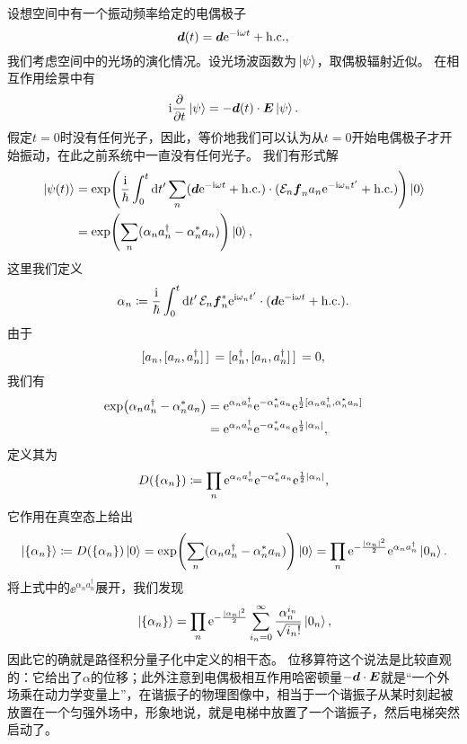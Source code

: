 设想空间中有一个振动频率给定的电偶极子
\begin{equation}
    \vb*{d}(t) = \vb*{d} \mathrm{e}^{- \mathrm{i} \omega t } + \text{h.c.},
\end{equation}
我们考虑空间中的光场的演化情况。设光场波函数为$\ket*{\psi}$，取偶极辐射近似。
在相互作用绘景中有
\begin{equation}
    \mathrm{i} \pdv{t} \ket*{\psi} = - \vb*{d}(t) \cdot \vb*{E} \ket*{\psi}.
\end{equation}
假定$t=0$时没有任何光子，因此，等价地我们可以认为从$t=0$开始电偶极子才开始振动，在此之前系统中一直没有任何光子。
我们有形式解
\[
    \begin{aligned}
        \ket*{\psi(t)} &= \exp(\frac{\mathrm{i}}{\hbar} \int_0^t \dd{t'} \sum_n (\vb*{d} \mathrm{e}^{- \mathrm{i} \omega t } + \text{h.c.}) \cdot (\mathcal{E}_n \vb*{f}_n a_n \mathrm{e}^{- \mathrm{i} \omega_n t'} + \text{h.c.}) ) \ket*{0} \\
        &= \exp(\sum_n (\alpha_n a_n^\dagger - \alpha_n^* a_n) ) \ket*{0},
    \end{aligned}
\]
这里我们定义
\begin{equation}
    \alpha_n \coloneqq \frac{\mathrm{i}}{\hbar} \int_0^t \dd{t'} \mathcal{E}_n \vb*{f}_n^* \mathrm{e}^{\mathrm{i} \omega_n t'} \cdot (\vb*{d} \mathrm{e}^{- \mathrm{i} \omega t} + \text{h.c.}).
\end{equation}
由于
\[
    \comm*{a_n}{\comm*{a_n}{a^\dagger_n}} = \comm*{a^\dagger_n}{\comm*{a_n}{a^\dagger_n}} = 0,
\]
我们有
\[
    \begin{aligned}
        \exp(\alpha_n a_n^\dagger - \alpha_n^* a_n) &= \ee^{\alpha_n a_n^\dagger} \ee^{- \alpha_n^* a_n} \ee^{\frac{1}{2} \comm*{\alpha_n a_n^\dagger}{\alpha_n^* a_n}} \\
        &= \ee^{\alpha_n a_n^\dagger} \ee^{- \alpha_n^* a_n} \ee^{\frac{1}{2} \abs{\alpha_n}},
    \end{aligned}
\]
定义其为
\begin{equation}
    D(\{\alpha_n\}) \coloneqq \prod_n \mathrm{e}^{\alpha_n a_n^\dagger} \mathrm{e}^{- \alpha_n^* a_n} \mathrm{e}^{\frac{1}{2} \abs{\alpha_n}},
    \label{eq:displacement-operator}
\end{equation}
它作用在真空态上给出
\begin{equation}
    \ket*{\{\alpha_n\}} \coloneqq D(\{\alpha_n\}) \ket*{0} = \exp(\sum_n (\alpha_n a_n^\dagger - \alpha_n^* a_n) ) \ket*{0} = \prod_n \mathrm{e}^{- \frac{\abs{\alpha_n}^2}{2}} \mathrm{e}^{\alpha_n a^\dagger_n} \ket*{0_n}.
\end{equation}
将上式中的$\ee^{\alpha_n a^\dagger_n}$展开，我们发现
\begin{equation}
    \ket*{\{\alpha_n\}} = \prod_n \mathrm{e}^{- \frac{\abs{\alpha_n}^2}{2}} \sum_{i_n=0}^\infty \frac{\alpha_n^{i_n}}{\sqrt{i_n!}} \ket*{0_n},
\end{equation}
因此它的确就是路径积分量子化中定义的相干态。
位移算符这个说法是比较直观的：它给出了$\alpha$的位移；此外注意到电偶极相互作用哈密顿量$- \vb*{d} \cdot \vb*{E}$就是“一个外场乘在动力学变量上”，在谐振子的物理图像中，相当于一个谐振子从某时刻起被放置在一个匀强外场中，形象地说，就是电梯中放置了一个谐振子，然后电梯突然启动了。

